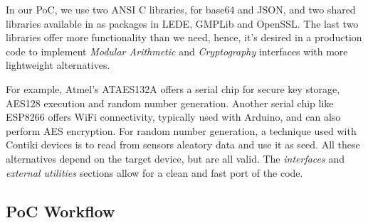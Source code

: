 In our PoC, we use two ANSI C libraries, for base64 and JSON, and two shared libraries available in as packages in LEDE, GMPLib and OpenSSL. The last two libraries offer more functionality than we need, hence, it's desired in a production code to implement \textit{Modular Arithmetic} and \textit{Cryptography} interfaces with more lightweight alternatives.

For example, Atmel's ATAES132A \citep{ATAES132A}
offers a serial chip for secure key storage, AES128 execution and random number generation. Another serial chip like ESP8266 offers WiFi connectivity, typically used with Arduino, and can also perform AES encryption. For random number generation, a technique used with Contiki devices is to read from sensors aleatory data and use it as seed. All these alternatives depend on the target device, but are all valid. The \textit{interfaces} and \textit{external utilities} sections allow for a clean and fast port of the code.


\subsection{PoC Workflow}





